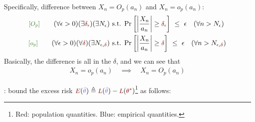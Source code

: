 \documentclass[11pt]{article}
\begin{document}
\begin{algorithm}
	Specifically, difference between  $X_n = O_p(a_n)$ and $X_n = o_p(a_n)$:
		\begin{align}
		\mgreen{[O_p]}  \qquad 
		(\forall \epsilon > 0) (\exists \mred{\delta_{\epsilon}}) (\exists N_{\epsilon}) 
		\text{ s.t. } 
		&\Prob{ \left|    \frac{X_n}{a_n}  \right|  \geq \mred{\delta_{\epsilon} } }
		~\leq~ \epsilon 
		\quad (\forall n > N_{\epsilon}) \\
		\mgreen{[o_p]}\qquad 
		(\forall \epsilon > 0)(\forall \mred{ \delta })(\exists N_{\epsilon,\mred{\delta}}) 
		\text{ s.t. }
		&\Prob{ \left|   \frac{X_n}{a_n}  \right| \geq \mred \delta }
		~\leq~ \epsilon 
		\quad (\forall n > N_{\epsilon,\mred \delta})
	\end{align}
	Basically, the difference is all in the $\delta$, and we can see that 
	\begin{align}
		X_n = o_p(a_n) \quad \implies \quad X_n = O_p(a_n)
	\end{align}
\end{algorithm}



: bound the excess risk $\mred{E}(\mblue{\hat \theta}) \triangleq \mred{L}(\mblue{\hat \theta}) - \mred{L}(\mred{\theta^*})$\footnote{Red: population quantities. Blue: empirical quantities.} as follows:
\end{document}
